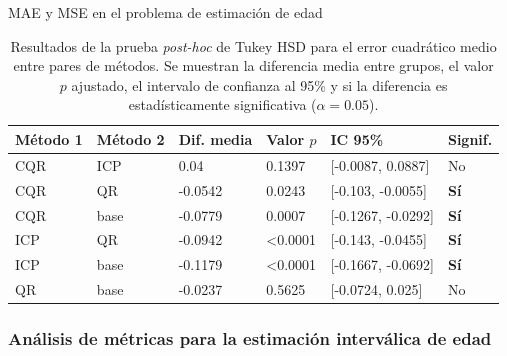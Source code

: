 \begin{StatisticsRef}{MAE y MSE en el problema de estimación de edad}
\begin{table}[H]
    \small
    \centering
    \begin{tabular}{llllll}
    \toprule
    \textbf{Método 1} & \textbf{Método 2} & \textbf{Dif. media} & \textbf{Valor $p$} & \textbf{IC 95\%} & \textbf{Signif.} \\ \hline
    CQR & ICP & 0.04 & 0.1397 & [-0.0087, 0.0887] & No \\
    CQR & QR & -0.0542 & 0.0243 & [-0.103, -0.0055] & \textbf{Sí} \\
    CQR & base & -0.0779 & 0.0007 & [-0.1267, -0.0292] & \textbf{Sí} \\
    ICP & QR & -0.0942 & \textless 0.0001 & [-0.143, -0.0455] & \textbf{Sí} \\
    ICP & base & -0.1179 & \textless 0.0001 & [-0.1667, -0.0692] & \textbf{Sí} \\
    QR & base & -0.0237 & 0.5625 & [-0.0724, 0.025] & No \\
    \bottomrule
    \end{tabular}
    \caption[
        Problema de estimación de edad: 
        Resultados de la prueba \textit{post-hoc} de Tukey HSD para el error cuadrático medio entre pares de métodos.
    ]{
        Resultados de la prueba \textit{post-hoc} de Tukey HSD para el error cuadrático medio entre pares de métodos.
        Se muestran la diferencia media entre grupos, el valor $p$ ajustado, el intervalo de confianza al 95\% y si la diferencia es estadísticamente significativa ($\alpha = 0.05$).
    }
    \label{tab:AE_tukey_mse}
\end{table}
\end{StatisticsRef}








\subsubsection{Análisis de métricas para la estimación interválica de edad}

